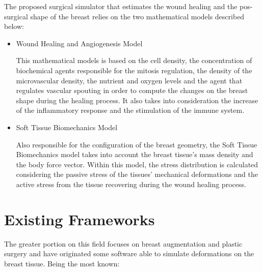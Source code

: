 \vspace{12mm}

The proposed surgical simulator that estimates the wound healing and the pos-surgical shape of the breast relies on the two mathematical models described below:

\begin{itemize}
\item Wound Healing and Angiogenesis Model

This mathematical models is based on the cell density, the concentration of biochemical agents responsible for the mitosis regulation, the density of the microvascular density, the nutrient and oxygen levels and the agent that regulates vascular spouting in order to compute the changes on the breast shape during the healing process. It also takes into consideration the increase of the inflammatory response and the stimulation of the immune system.

\item Soft Tissue Biomechanics Model

Also responsible for the configuration of the breast geometry, the Soft Tissue Biomechanics model takes into account the breast tissue's mass density and the body force vector. Within this model, the stress distribution is calculated considering the passive stress of the tissues' mechanical deformations and the active stress from the tissue recovering during the wound healing process.  

\end{itemize}

\section{Existing Frameworks}\label{sec:ferramentas}

The greater portion on this field focuses on breast augmentation and plastic surgery and have originated some software able to simulate deformations on the breast tissue. Being the most known:

